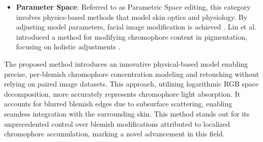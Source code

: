 \begin{spacing}{1.5}
\begin{itemize}
    \item \textbf{Parameter Space}: Referred to as Parametric Space editing, this category involves physics-based methods that model skin optics and physiology. By adjusting model parameters, facial image modification is achieved \cite{jungDeepLearningbasedOptical2023a, tsumuraImagebasedSkinColor}. Lin et al. introduced a method for modifying chromophore content in pigmentation, focusing on holistic adjustments \cite{linExemplarbasedFreckleRetouching2019}.

\end{itemize}

The proposed method introduces an innovative physical-based model enabling precise, per-blemish chromophore concentration modeling and retouching without relying on paired image datasets. This approach, utilizing logarithmic RGB space decomposition, more accurately represents chromophore light absorption. It accounts for blurred blemish edges due to subsurface scattering, enabling seamless integration with the surrounding skin. This method stands out for its unprecedented control over blemish modifications attributed to localized chromophore accumulation, marking a novel advancement in this field.

\end{spacing}
\newpage
